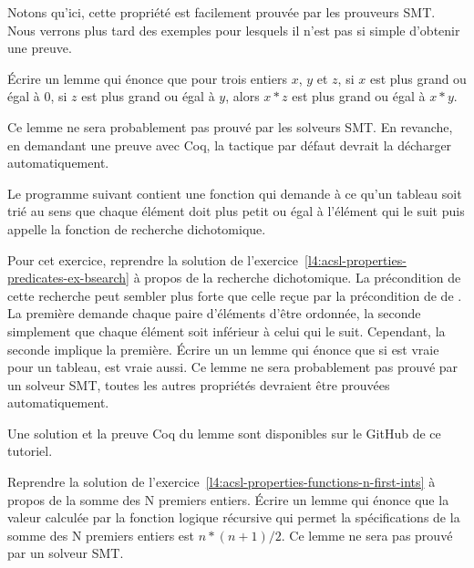 Notons qu'ici, cette propriété est facilement prouvée par les prouveurs SMT. Nous
verrons plus tard des exemples pour lesquels il n'est pas si simple d'obtenir une
preuve.







Écrire un lemme qui énonce que pour trois entiers $x$, $y$ et $z$, si $x$ est
plus grand ou égal à $0$, si $z$ est plus grand ou égal à $y$, alors $x * z$ 
est  plus grand ou égal à $x * y$.


Ce lemme ne sera probablement pas prouvé par les solveurs SMT. En revanche, en
demandant une preuve avec Coq, la tactique par défaut devrait la décharger
automatiquement.


\label{l4:acsl-properties-lemmas-lsorted-gsorted}


Le programme suivant contient une fonction qui demande à ce qu'un tableau soit
trié au sens que chaque élément doit plus petit ou égal à l'élément qui le suit
puis appelle la fonction de recherche dichotomique.




Pour cet exercice, reprendre la solution de 
l'exercice~\ref{l4:acsl-properties-predicates-ex-bsearch} à propos de la recherche
dichotomique. La précondition de cette recherche peut sembler plus forte que celle
reçue par la précondition de de . La première demande
chaque paire d'éléments d'être ordonnée, la seconde simplement que chaque élément
soit inférieur à celui qui le suit. Cependant, la seconde implique la première.
Écrire un un lemme qui énonce que si  est vraie
pour un tableau,  est vraie aussi. Ce lemme ne sera probablement
pas prouvé par un solveur SMT, toutes les autres propriétés devraient être prouvées
automatiquement.


Une solution et la preuve Coq du lemme sont disponibles sur le GitHub de ce tutoriel.


\label{l4:acsl-properties-lemmas-n-first-ints}


Reprendre la solution de l'exercice~\ref{l4:acsl-properties-functions-n-first-ints}
à propos de la somme des N premiers entiers. Écrire un lemme qui énonce que la valeur
calculée par la fonction logique récursive qui permet la spécifications de la somme des
N premiers entiers est $n*(n+1)/2$. Ce lemme ne sera pas prouvé par un solveur SMT.


